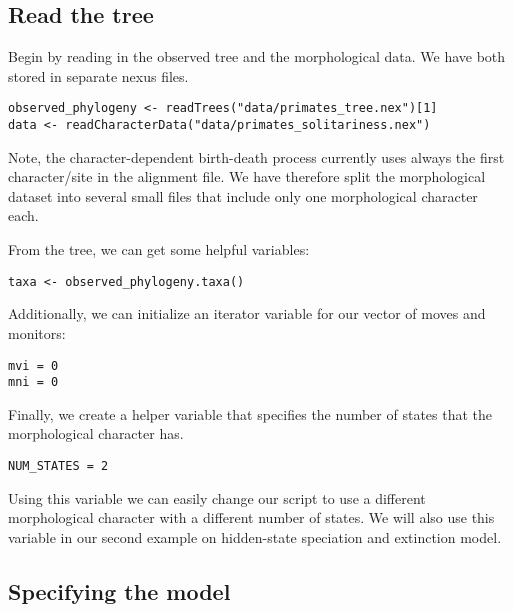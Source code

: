 \subsection{Read the tree}

Begin by reading in the observed tree and the morphological data. 
We have both stored in separate nexus files.
{\tt \begin{snugshade*}
\begin{lstlisting}
observed_phylogeny <- readTrees("data/primates_tree.nex")[1]
data <- readCharacterData("data/primates_solitariness.nex")
\end{lstlisting}
\end{snugshade*}}
Note, the character-dependent birth-death process currently uses always the first character/site in the alignment file.
We have therefore split the morphological dataset into several small files that include only one morphological character each.

From the tree, we can get some helpful variables:
{\tt \begin{snugshade*}
\begin{lstlisting}
taxa <- observed_phylogeny.taxa()
\end{lstlisting}
\end{snugshade*}}

Additionally, we can initialize an iterator variable for our vector of moves and monitors:
{\tt \begin{snugshade*}
\begin{lstlisting}
mvi = 0
mni = 0
\end{lstlisting}
\end{snugshade*}}

Finally, we create a helper variable that specifies the number of states that the morphological character has.
{\tt \begin{snugshade*}
\begin{lstlisting}
NUM_STATES = 2
\end{lstlisting}
\end{snugshade*}}
Using this variable we can easily change our script to use a different morphological character with a different number of states.
We will also use this variable in our second example on hidden-state speciation and extinction model. 



\subsection{Specifying the model}

